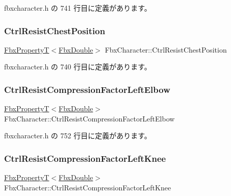  fbxcharacter.\+h の 741 行目に定義があります。

\mbox{\label{class_fbx_character_a6c50588335a593f5b77c3171b716a239}} 
\subsubsection{\texorpdfstring{Ctrl\+Resist\+Chest\+Position}{CtrlResistChestPosition}}
{\footnotesize\ttfamily \hyperlink{class_fbx_property_t}{Fbx\+PropertyT}$<$\hyperlink{fbxtypes_8h_a171e72a1c46fc15c1a6c9c31948c1c5b}{Fbx\+Double}$>$ Fbx\+Character\+::\+Ctrl\+Resist\+Chest\+Position}



 fbxcharacter.\+h の 740 行目に定義があります。

\mbox{\label{class_fbx_character_a65c4098ee968f0c46fc12bb9cf4f464c}} 
\subsubsection{\texorpdfstring{Ctrl\+Resist\+Compression\+Factor\+Left\+Elbow}{CtrlResistCompressionFactorLeftElbow}}
{\footnotesize\ttfamily \hyperlink{class_fbx_property_t}{Fbx\+PropertyT}$<$\hyperlink{fbxtypes_8h_a171e72a1c46fc15c1a6c9c31948c1c5b}{Fbx\+Double}$>$ Fbx\+Character\+::\+Ctrl\+Resist\+Compression\+Factor\+Left\+Elbow}



 fbxcharacter.\+h の 752 行目に定義があります。

\mbox{\label{class_fbx_character_aa286de94f00e9324a087051e5619c294}} 
\subsubsection{\texorpdfstring{Ctrl\+Resist\+Compression\+Factor\+Left\+Knee}{CtrlResistCompressionFactorLeftKnee}}
{\footnotesize\ttfamily \hyperlink{class_fbx_property_t}{Fbx\+PropertyT}$<$\hyperlink{fbxtypes_8h_a171e72a1c46fc15c1a6c9c31948c1c5b}{Fbx\+Double}$>$ Fbx\+Character\+::\+Ctrl\+Resist\+Compression\+Factor\+Left\+Knee}



